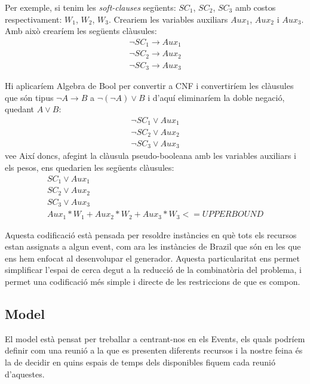 \documentclass[11pt,a4paper,twoside]{report}
\begin{document}
  Per exemple, si tenim les \textit{soft-clauses} següents: $SC_1$, $SC_2$, $SC_3$ amb costos respectivament: $W_1$, $W_2$, $W_3$. 
  Creariem les variables auxiliars $Aux_1$, $Aux_2$ i $Aux_3$. Amb això crearíem les següents clàusules:
  \begin{gather*}
    \neg SC_1 \rightarrow Aux_1 \\
    \neg SC_2 \rightarrow Aux_2 \\
    \neg SC_3 \rightarrow Aux_3
  \end{gather*}

  Hi aplicaríem Algebra de Bool per convertir a CNF i convertiríem les clàusules que són tipus $\neg A \rightarrow B$ a $\neg (\neg A) \vee B$ i d'aquí eliminaríem la doble negació, quedant $A \vee B$:
  \begin{gather*}
    \neg SC_1 \vee Aux_1 \\
    \neg SC_2 \vee Aux_2 \\
    \neg SC_3 \vee Aux_3
  \end{gather*}vee
  Així doncs, afegint la clàusula pseudo-booleana amb les variables auxiliars i els pesos, ens quedarien les següents clàusules:
  \begin{gather*}
      SC_1 \vee Aux_1 \\
      SC_2 \vee Aux_2 \\
      SC_3 \vee Aux_3 \\
      Aux_1*W_1 + Aux_2*W_2 + Aux_3*W_3 <= UPPERBOUND
  \end{gather*}


  Aquesta codificació està pensada per resoldre instàncies en què tots els recursos estan assignats a algun event, com ara les instàncies de Brazil que són en les que ens hem enfocat al desenvolupar el generador. 
  Aquesta particularitat ens permet simplificar l'espai de cerca degut a la reducció de la combinatòria del problema, i permet una codificació més simple i directe de les restriccions de que es compon.

  \subsection{Model}

  El model està pensat per treballar a centrant-nos en els Events, els quals podríem definir com una reunió a la que es presenten diferents recursos i la nostre feina és la de decidir en quins espais de temps dels disponibles fiquem cada reunió d'aquestes.
\end{document}
